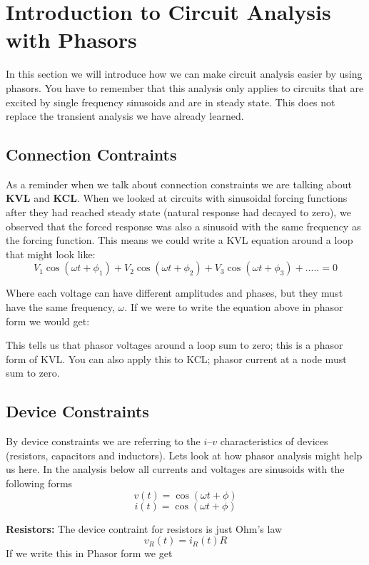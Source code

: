 \documentclass{handout}
\begin{document}
\newpage
\clearpage
\pagebreak

\section{Introduction to Circuit Analysis with Phasors}
In this section we will introduce how we can make circuit analysis easier by using phasors.  You have to remember that this analysis only applies to circuits that are excited by single frequency sinusoids and are in steady state.  This does not replace the transient analysis we have already learned.

\subsection{Connection Contraints}
As a reminder when we talk about connection constraints we are talking about \textbf{KVL} and \textbf{KCL}.  When we looked at circuits with sinusoidal forcing functions after they had reached steady state (natural response had decayed to zero), we observed that the forced response was also a sinusoid with the same frequency as the forcing function.  This means we could write a KVL equation around a loop that might look like:
\[
V_1\cos(\omega t +\phi_1) +V_2\cos(\omega t +\phi_2) + V_3\cos(\omega t +\phi_3) +..... = 0
\]

Where each voltage can have different amplitudes and phases, but they must have the same frequency, $\omega$.  If we were to write the equation above in phasor form we would get:

\soln{1in}{
\[
V_1\angle \phi_1+V_2\angle \phi_2+V_3\angle \phi_3+..... = 0
\]
}
This tells us that phasor voltages around a loop sum to zero; this is a phasor form of KVL.  You can also apply this to KCL; phasor current at a node must sum to zero.

\subsection{Device Constraints}
By device constraints we are referring to the $i$--$v$ characteristics of devices (resistors, capacitors and inductors).  Lets look at how phasor analysis might help us here. In the analysis below all currents and voltages are sinusoids with the following forms
\[
v(t) = \cos(\omega t +\phi)
\]
\[
i(t) = \cos (\omega t +\phi)
\]


\textbf{Resistors:}  The device contraint for resistors is just Ohm's law
\[
v_R(t) = i_R(t)R
\]
If we write this in Phasor form we get
\soln{1in}{
\[
V_R\angle \phi_V = I_R\angle \phi_I \times R
\]
}
\end{document}
